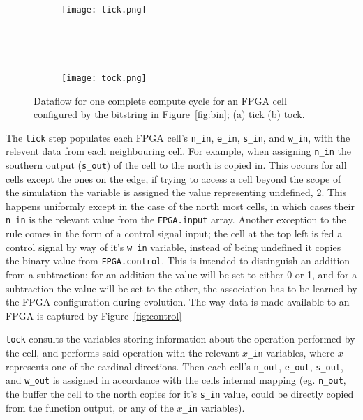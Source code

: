\begin{figure}
	\centering
	\begin{subfigure}[ht]{0.45\textwidth}
		\texttt{[image: tick.png]}
		\caption{}
	\end{subfigure}
	~
	\begin{subfigure}[ht]{0.08\textwidth}
	\end{subfigure}
	~
	\begin{subfigure}[ht]{0.45\textwidth}
		\texttt{[image: tock.png]}
		\caption{}
	\end{subfigure}

	\caption{Dataflow for one complete compute cycle for an FPGA cell configured by the bitstring in
	Figure~\ref{fig:bin}; (a) tick (b) tock.}
	\label{fig:ticktock}
\end{figure}

The \texttt{tick} step populates each FPGA cell's \texttt{n\_in}, \texttt{e\_in},
\texttt{s\_in}, and \texttt{w\_in}, with the relevent data from each neighbouring cell.
For example, when assigning \texttt{n\_in} the southern output (\texttt{s\_out})
of the cell to the north is copied in. This occurs for all cells except the ones on the edge, if trying
to access a cell beyond the scope of the simulation the variable is assigned the value
representing undefined, 2. This happens uniformly except in the case of the north most cells,
in which cases their \texttt{n\_in} is the relevant value from the \texttt{FPGA.input}
array. Another exception to the rule comes in the form of a control signal input; the cell at the top
left is fed a control signal by way of it's \texttt{w\_in} variable, instead of being undefined
it copies the binary value from \texttt{FPGA.control}. This is intended to distinguish
an addition from a subtraction; for an addition the value will be set to either 0 or 1,
and for a subtraction the value will be set to the other, the association has to be
learned by the FPGA configuration during evolution. The way data is made available to an FPGA
is captured by Figure~\ref{fig:control}

\texttt{tock} consults the variables storing information about the operation
performed by the cell, and performs said operation with the relevant $x$\texttt{\_in} variables,
where $x$ represents one of the cardinal directions.
Then each cell's \texttt{n\_out}, \texttt{e\_out}, \texttt{s\_out}, and \texttt{w\_out}
is assigned in accordance with the cells internal mapping (eg. \texttt{n\_out}, the
buffer the cell to the north copies for it's \texttt{s\_in} value, could be directly
copied from the function output, or any of the $x$\texttt{\_in} variables).

